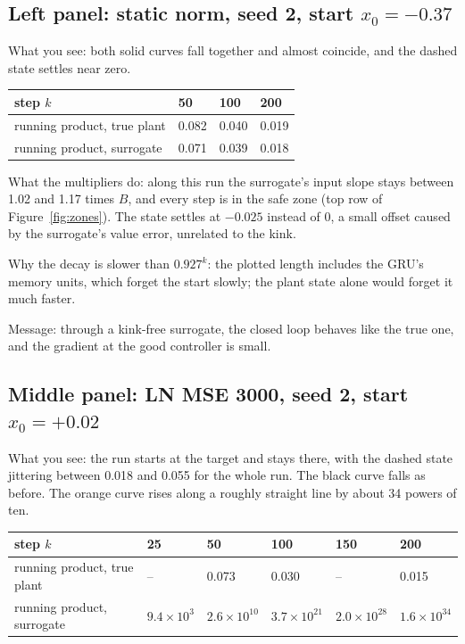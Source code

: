 \documentclass[11pt]{article}
\begin{document}
\subsection{Left panel: static norm, seed 2, start $x_0=-0.37$}

What you see: both solid curves fall together and almost coincide, and the dashed state settles near zero.

\begin{center}
\begin{tabular}{llll}
\toprule
step $k$ & 50 & 100 & 200 \\
\midrule
running product, true plant & 0.082 & 0.040 & 0.019 \\
running product, surrogate & 0.071 & 0.039 & 0.018 \\
\bottomrule
\end{tabular}
\end{center}

What the multipliers do: along this run the surrogate's input slope stays between 1.02 and 1.17 times $B$, and every step is in the safe zone (top row of Figure~\ref{fig:zones}). The state settles at $-0.025$ instead of 0, a small offset caused by the surrogate's value error, unrelated to the kink.

Why the decay is slower than $0.927^k$: the plotted length includes the GRU's memory units, which forget the start slowly; the plant state alone would forget it much faster.

Message: through a kink-free surrogate, the closed loop behaves like the true one, and the gradient at the good controller is small.

\subsection{Middle panel: LN MSE 3000, seed 2, start $x_0=+0.02$}

What you see: the run starts at the target and stays there, with the dashed state jittering between 0.018 and 0.055 for the whole run. The black curve falls as before. The orange curve rises along a roughly straight line by about 34 powers of ten.

\begin{center}
\begin{tabular}{llllll}
\toprule
step $k$ & 25 & 50 & 100 & 150 & 200 \\
\midrule
running product, true plant & -- & 0.073 & 0.030 & -- & 0.015 \\
running product, surrogate & $9.4\times10^3$ & $2.6\times10^{10}$ & $3.7\times10^{21}$ & $2.0\times10^{28}$ & $1.6\times10^{34}$ \\
\bottomrule
\end{tabular}
\end{center}
\end{document}

